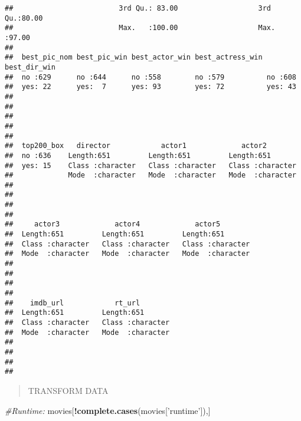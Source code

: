 \documentclass[]{article}
\newenvironment{Shaded}{\begin{snugshade}}{\end{snugshade}}
\newcommand{\CommentTok}[1]{\textcolor[rgb]{0.56,0.35,0.01}{\textit{#1}}}
\newcommand{\KeywordTok}[1]{\textcolor[rgb]{0.13,0.29,0.53}{\textbf{#1}}}
\newcommand{\NormalTok}[1]{#1}
\newcommand{\OperatorTok}[1]{\textcolor[rgb]{0.81,0.36,0.00}{\textbf{#1}}}
\newcommand{\StringTok}[1]{\textcolor[rgb]{0.31,0.60,0.02}{#1}}
\begin{document}
\begin{verbatim}
##                         3rd Qu.: 83.00                   3rd Qu.:80.00  
##                         Max.   :100.00                   Max.   :97.00  
##                                                                         
##  best_pic_nom best_pic_win best_actor_win best_actress_win best_dir_win
##  no :629      no :644      no :558        no :579          no :608     
##  yes: 22      yes:  7      yes: 93        yes: 72          yes: 43     
##                                                                        
##                                                                        
##                                                                        
##                                                                        
##                                                                        
##  top200_box   director            actor1             actor2         
##  no :636    Length:651         Length:651         Length:651        
##  yes: 15    Class :character   Class :character   Class :character  
##             Mode  :character   Mode  :character   Mode  :character  
##                                                                     
##                                                                     
##                                                                     
##                                                                     
##     actor3             actor4             actor5         
##  Length:651         Length:651         Length:651        
##  Class :character   Class :character   Class :character  
##  Mode  :character   Mode  :character   Mode  :character  
##                                                          
##                                                          
##                                                          
##                                                          
##    imdb_url            rt_url         
##  Length:651         Length:651        
##  Class :character   Class :character  
##  Mode  :character   Mode  :character  
##                                       
##                                       
##                                       
## 
\end{verbatim}

\begin{quote}
TRANSFORM DATA
\end{quote}

\begin{Shaded}
\begin{Highlighting}[]
\CommentTok{#Runtime:}
\NormalTok{movies[}\OperatorTok{!}\KeywordTok{complete.cases}\NormalTok{(movies[}\StringTok{'runtime'}\NormalTok{]),]}
\end{Highlighting}
\end{Shaded}
\end{document}
